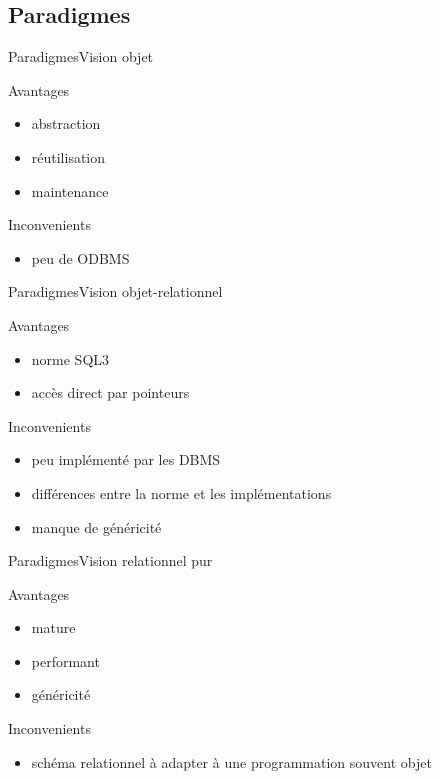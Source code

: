 \subsection{Paradigmes}
\begin{frame}{Paradigmes}{Vision objet}
  \begin{block}{Avantages}
    \begin{itemize}
      \item abstraction
      \item réutilisation
      \item maintenance
    \end{itemize}
  \end{block}
  \begin{block}{Inconvenients}
    \begin{itemize}
      \item peu de ODBMS
    \end{itemize}
  \end{block}
\end{frame}

\begin{frame}{Paradigmes}{Vision objet-relationnel}
  \begin{block}{Avantages}
    \begin{itemize}
      \item norme SQL3
      \item accès direct par pointeurs
    \end{itemize}
  \end{block}
  \begin{block}{Inconvenients}
    \begin{itemize}
      \item peu implémenté par les DBMS
      \item différences entre la norme et les implémentations
      \item manque de généricité
    \end{itemize}
  \end{block}
\end{frame}

\begin{frame}{Paradigmes}{Vision relationnel pur}
  \begin{block}{Avantages}
    \begin{itemize}
      \item mature
      \item performant
      \item généricité
    \end{itemize}
  \end{block}
  \begin{block}{Inconvenients}
    \begin{itemize}
      \item schéma relationnel à adapter à une programmation souvent objet
    \end{itemize}
  \end{block}
\end{frame}

